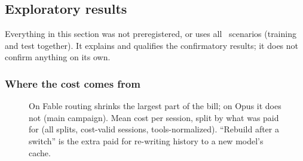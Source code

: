 \subsection{Exploratory results \texorpdfstring{\screen}{[screen]}}\label{vt:sec:explore}

Everything in this section was not preregistered, or uses all \NScenarios\ scenarios (training and test
together). It explains and qualifies the confirmatory results; it does not confirm anything on its own.

\subsubsection{Where the cost comes from}\label{vt:sec:composition}

\begin{figure}[tbp]
\centering
{}\par\smallskip

\caption{On Fable routing shrinks the largest part of the bill; on Opus it does not (main campaign). Mean cost per session, split by what was paid for (all splits, cost-valid sessions,
tools-normalized). ``Rebuild after a switch'' is the extra paid for re-writing history to a new model's
cache.}
\label{vt:fig:composition}
\end{figure}

\begin{table}[tbp]
\centering\small
\caption{The numbers behind \cref{vt:fig:composition}: dollars per session by token class, main-loop requests per
session, and cache-read tokens per session (millions).}
\label{vt:tab:composition}
{\footnotesize\setlength{\tabcolsep}{2pt}}
\end{table}

